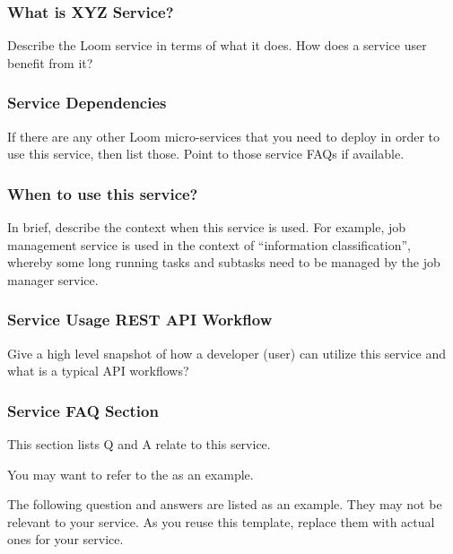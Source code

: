 \documentclass[letterpaper,10pt,english]{sphinxmanual}
\begin{document}
\subsubsection{What is XYZ Service?}
\label{\detokenize{mcdmp_docx_res:what-is-xyz-service}}\label{\detokenize{mcdmp_docx_res:t-faq-service-what}}
Describe the Loom service in terms of what it does. How does a service user benefit from it?


\subsubsection{Service Dependencies}
\label{\detokenize{mcdmp_docx_res:t-faq-service-dep}}\label{\detokenize{mcdmp_docx_res:service-dependencies}}
If there are any other Loom micro-services that you need to deploy in order to use this service, then list those.  Point to those service FAQs if available.


\subsubsection{When to use this service?}
\label{\detokenize{mcdmp_docx_res:t-faq-service-when}}\label{\detokenize{mcdmp_docx_res:when-to-use-this-service}}
In brief, describe the context when this service is used.  For example, job management service is used in the context of “information classification”, whereby some long running tasks and subtasks need to be managed by the job manager service.


\subsubsection{Service Usage REST API Workflow}
\label{\detokenize{mcdmp_docx_res:t-faq-service-how}}\label{\detokenize{mcdmp_docx_res:service-usage-rest-api-workflow}}
Give a high level snapshot of how a developer (user) can utilize this service and what is a typical API workflows?


\subsubsection{Service FAQ Section}
\label{\detokenize{mcdmp_docx_res:t-faq-service-misc}}\label{\detokenize{mcdmp_docx_res:service-faq-section}}
This section lists Q and A relate to this service.

You may want to refer to the  as an example.

The following question and answers are listed as an example. They may not be relevant to your service. As you reuse this template, replace them with actual ones for your service.
\end{document}
